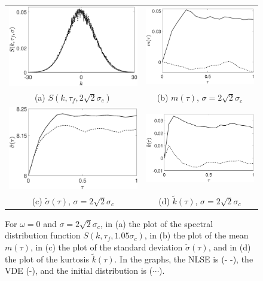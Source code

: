 \documentclass[a4paper,11pt]{article}
\begin{document}
\begin{figure}[!ht]
\centering
\begin{tabular}{cc}
\includegraphics[width=.48\textwidth]{pdf_w_0_ep_pt05_Nens_512_sig0_2sqrt2} & \includegraphics[width=.45\textwidth]{mean_w_0_ep_pt05_Nens_512_sig0_2sqrt2} \\
(a) $S(k,\tau_{f},2\sqrt{2}\sigma_{c})$ & (b) $m(\tau)$, $\sigma = 2\sqrt{2}\sigma_{c}$\\
\includegraphics[width=.48\textwidth]{std_w_0_ep_pt05_Nens_512_sig0_2sqrt2} & \includegraphics[width=.48\textwidth]{kts_w_0_ep_pt05_Nens_512_sig0_2sqrt2} \\
(c) $\tilde{\sigma}(\tau)$, $\sigma = 2\sqrt{2}\sigma_{c}$ & (d) $\tilde{k}(\tau)$, $\sigma = 2\sqrt{2}\sigma_{c}$
\end{tabular}
\caption{For $\omega=0$ and $\sigma=2\sqrt{2} \sigma_{c}$, in (a) the plot of the spectral distribution function $S(k,\tau_{f},1.05\sigma_{c})$, in (b) the plot of the mean $m(\tau)$, in (c) the plot of the standard deviation $\tilde{\sigma}(\tau)$, and in (d) the plot of the kurtosis $\tilde{k}(\tau)$. In the graphs, the NLSE is (- -), the VDE (-), and the initial distribution is ($\cdots$).}
\label{fig:stbleom0wide}
\end{figure}
\end{document}
